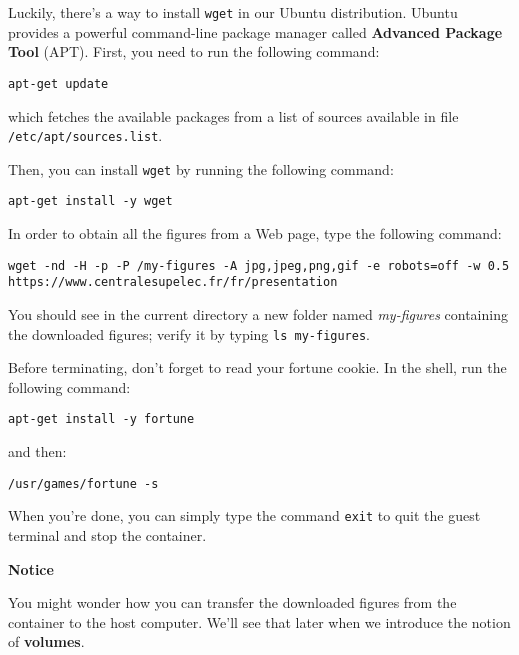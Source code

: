 \documentclass[
]{article}
\newenvironment{infobox}[1]
  {
  \begin{itemize}
  \renewcommand{\labelitemi}{
    \raisebox{-.7\height}[0pt][0pt]{
      
    }
  }
  \setlength{\fboxsep}{1em}
  \begin{whitebox}
  \item
  }
  {
  \end{whitebox}
  \end{itemize}
  }
\theoremstyle{definition}
\theoremstyle{definition}
\theoremstyle{definition}
\theoremstyle{remark}
\begin{document}
Luckily, there's a way to install \texttt{wget} in our Ubuntu distribution.
Ubuntu provides a powerful command-line package manager called
\textbf{Advanced Package Tool} (APT).
First, you need to run the following command:

\begin{verbatim}
apt-get update
\end{verbatim}

which fetches the available packages from a list of sources
available in file \texttt{/etc/apt/sources.list}.

Then, you can install \texttt{wget} by running the following command:

\begin{verbatim}
apt-get install -y wget
\end{verbatim}

In order to obtain all the figures from a
Web page, type the following command:

\begin{verbatim}
wget -nd -H -p -P /my-figures -A jpg,jpeg,png,gif -e robots=off -w 0.5 https://www.centralesupelec.fr/fr/presentation
\end{verbatim}

You should see in the current directory a new folder
named \emph{my-figures} containing the downloaded figures;
verify it by typing \texttt{ls\ my-figures}.

Before terminating, don't forget to read your fortune cookie.
In the shell, run the following command:

\begin{verbatim}
apt-get install -y fortune
\end{verbatim}

and then:

\begin{verbatim}
/usr/games/fortune -s
\end{verbatim}

When you're done, you can simply type the command \texttt{exit} to quit
the guest terminal and stop the container.

\begin{infobox}{warning}

\textbf{Notice}

You might wonder how you can transfer the downloaded figures
from the container to the host computer.
We'll see that later
when we introduce the notion of \textbf{volumes}.

\end{infobox}
\end{document}
